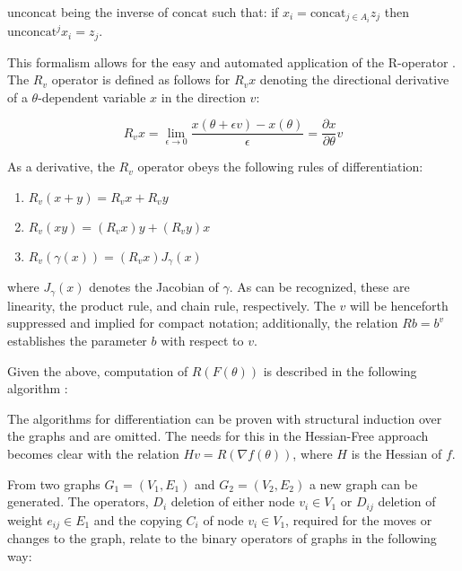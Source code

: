 $\text{unconcat}$ being the inverse of $\text{concat}$ such that: if $x_i = \text{concat}_{j\in A_i} z_j$ then $\text{unconcat}^j x_i = z_j$. 

This formalism allows for the easy and automated application of the R-operator \cite{pepe}. The $R_v$ operator is defined as follows for $R_vx $ denoting the directional derivative of a $\theta$-dependent variable $x$ in the direction $v$:

\[R_vx = \lim_{\epsilon\to 0} \frac{x(\theta + \epsilon v) - x(\theta)}{\epsilon} = \frac{\partial x}{\partial\theta}v\]

As a derivative, the $R_v$ operator obeys the following rules of differentiation:

\begin{enumerate}
    \item $R_v(x+y) = R_vx + R_vy$
    \item $ R_v(xy) = (R_vx)y + (R_vy)x $
    \item $R_v(\gamma(x)) = (R_vx) J_{\gamma}(x)$
\end{enumerate}

where $J_\gamma(x)$ denotes the Jacobian of $\gamma$. As can be recognized, these are linearity, the product rule, and chain rule, respectively. The $v$ will be henceforth suppressed and implied for compact notation; additionally, the relation $Rb = b^v$ establishes the parameter $b$ with respect to $v$.

Given the above, computation of $R(F(\theta))$ is described in the following algorithm \cite{suts}:

\begin{algorithmic}[1]
    \EndFor
\end{algorithmic}

The algorithms for differentiation can be proven with structural induction over the graphs and are omitted. The needs for this in the Hessian-Free approach becomes clear with the relation $Hv = R(\nabla f(\theta))$, where $H$ is the Hessian of $f$. 

From two graphs $G_1 = (V_1,E_1)$ and $G_2 = (V_2, E_2)$ a new graph can be generated. The operators, $D_i$ deletion of either node $v_i \in V_1$ or $D_{ij}$ deletion of weight $e_{ij} \in E_1$ and the copying $C_i$ of node $v_i \in V_1$, required for the moves or changes to the graph, relate to the binary operators of graphs in the following way:

